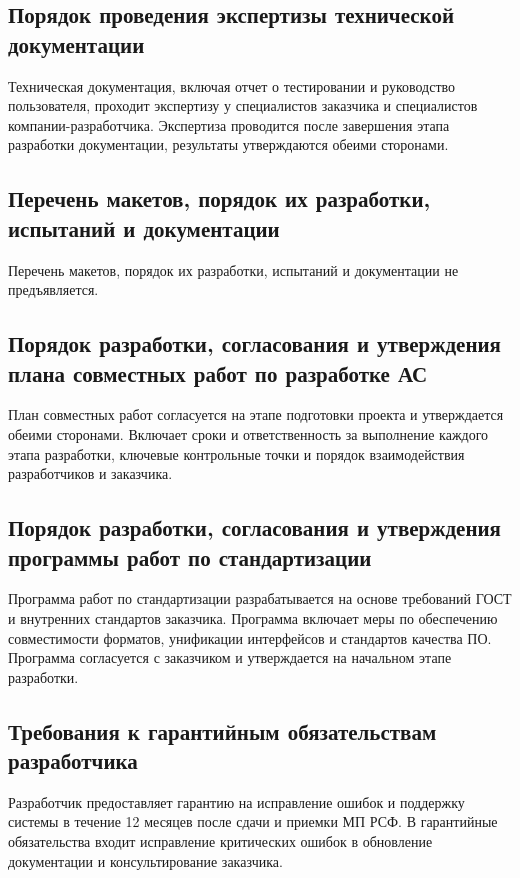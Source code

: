 \subsection{Порядок проведения экспертизы технической документации}

Техническая документация, включая отчет о тестировании
и руководство пользователя, проходит экспертизу у специалистов заказчика
и специалистов компании-разработчика.
Экспертиза проводится после завершения этапа разработки документации,
результаты утверждаются обеими сторонами. 

\subsection{Перечень макетов, порядок их разработки, испытаний и документации}

Перечень макетов, порядок их разработки, испытаний
и документации не предъявляется.

\subsection{Порядок разработки, согласования
	и утверждения плана совместных работ по разработке АС}

План совместных работ согласуется на этапе подготовки проекта
и утверждается обеими сторонами.
Включает сроки и ответственность за выполнение каждого этапа разработки,
ключевые контрольные точки и порядок взаимодействия разработчиков и заказчика. 

\subsection{Порядок разработки, согласования
	и утверждения программы работ по стандартизации}

Программа работ по стандартизации разрабатывается на основе требований ГОСТ
и внутренних стандартов заказчика.
Программа включает меры по обеспечению совместимости форматов,
унификации интерфейсов и стандартов качества ПО.
Программа согласуется с заказчиком
и утверждается на начальном этапе разработки.

\subsection{Требования к гарантийным обязательствам разработчика}

Разработчик предоставляет гарантию на исправление ошибок
и поддержку системы в течение 12 месяцев после сдачи и приемки МП РСФ.
В гарантийные обязательства входит исправление критических ошибок
в обновление документации и консультирование заказчика.

